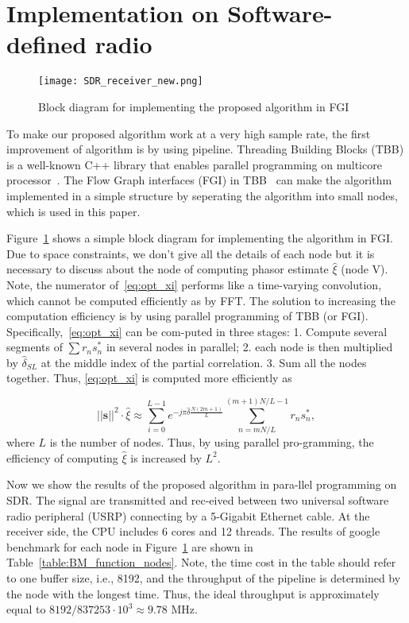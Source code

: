 \section{Implementation on Software-defined radio}
\label{sec:implementation_on_SDR}

\begin{figure}[t]
    \centerline{\texttt{[image: SDR\_receiver\_new.png]}}
    \caption{Block diagram for implementing the proposed algorithm in FGI}
    \label{fig:SDR_receiver}
    \end{figure}

To make our proposed algorithm work at a very high sample rate,
the first improvement of algorithm is by using pipeline.
Threading Building Blocks (TBB) is a well-known C++
library that enables parallel programming on multicore processor~\cite{Michael_19}.
The Flow Graph interfaces (FGI) in TBB~\cite[Ch.~3]{Michael_19} can make the algorithm implemented in a simple structure
by seperating the algorithm into small nodes, which is used in this paper.

Figure~\ref{fig:SDR_receiver} shows a simple block diagram for implementing the algorithm in FGI.
Due to space constraints, we don't give all the details of each node but it is necessary to discuss about
the node of computing phasor estimate $\hat{\xi}$ (node V). Note, the numerator of~\eqref{eq:opt_xi}
performs like a time-varying convolution, which cannot be computed efficiently as by FFT.
The solution to increasing the computation efficiency is by using parallel programming 
of TBB (or FGI). Specifically,~\eqref{eq:opt_xi} can be com-puted in three stages:
1. Compute several segments of $\sum r_ns_n^*$ in several nodes in parallel;
2. each node is then multiplied by $\hat{\delta}_{SL}$ at the middle index of the 
partial correlation.
3. Sum all the nodes together.
Thus, \eqref{eq:opt_xi} is computed more efficiently as

\begin{equation}
    \label{eq:refined_opt_S}
    ||\bm{s}||^2\cdot\hat{\xi} \approx \sum_{i=0}^{L-1} e^{-j\pi \hat{\delta}\frac{N(2m+1)}{L}}
    \sum_{n=mN/L}^{(m+1)N/L-1}r_ns_n^*,
  \end{equation}
where $L$ is the number of nodes. Thus, by using parallel pro-gramming,
the efficiency of computing $\hat{\xi}$ is increased by $L^2$.

Now we show the results of the proposed algorithm in para-llel programming on SDR.
The signal are transmitted and rec-eived between two universal software radio peripheral (USRP)
connecting by a 5-Gigabit Ethernet cable. At the receiver side, 
the CPU includes 6 cores and 12 threads. The results of 
google benchmark for each node in Figure~\ref{fig:SDR_receiver}
are shown in Table~\ref{table:BM_function_nodes}. Note, the time cost in the table
should refer to one buffer size, i.e., 8192, and the throughput of the 
pipeline is determined by the node with the longest time. Thus, the ideal throughput is approximately equal to
$8192/837253 \cdot 10^3 \approx 9.78$ MHz.

